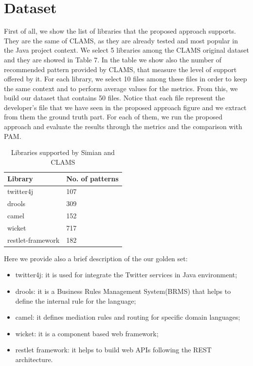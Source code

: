 \section{Dataset}
First of all, we show the list of libraries that the proposed approach supports. They are the same of CLAMS, as they are already tested and most popular in the Java project context. We select 5 libraries among the CLAMS original dataset and they are showed in Table 7. In the table we show also the number of recommended pattern provided by CLAMS, that measure the level of support offered by it. For each library, we select 10 files among these files in order to keep the same context and to perform average values for the metrics. From this, we build our dataset that contains 50 files. Notice that each file represent the developer's file that we have seen in the proposed approach figure and we extract from them the ground truth part. For each of them, we run the proposed approach and evaluate the results through the metrics and the comparison with PAM.


\begin{table}[!h]
	\centering
	\begin{tabular}{|p{3.5cm}|p{3.5cm}|}\hline
	 \textbf{Library} & \textbf{No. of patterns}  \\\hline
	 twitter4j &  107   \\\hline
	drools & 309 \\\hline
	camel & 152  \\\hline 
	wicket & 717  \\\hline
	restlet-framework & 182  \\\hline
	\end{tabular}
	\caption{ Libraries supported by Simian and CLAMS }\label{Table:7}
\end{table} 


Here we provide also a brief description of the our golden set:
\begin{itemize}
\item twitter4j: it is used for integrate the Twitter services in Java environment;
\item drools: it is a Business Rules Management System(BRMS) that helps to define the internal rule for the language;
\item camel: it defines mediation rules and routing for specific domain languages;
\item wicket: it is a component based web framework;
\item restlet framework: it helps to build web APIs following the REST architecture. 
\end{itemize}




